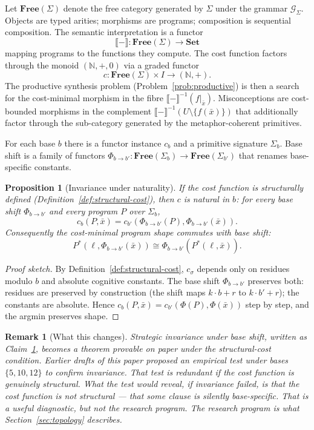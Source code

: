 \documentclass[11pt]{article}
\newtheorem{remark}{Remark}
\newtheorem{proposition}{Proposition}
\begin{document}
Let $\mathbf{Free}(\Sigma)$ denote the free category generated by
$\Sigma$ under the grammar $\mathcal{G}_\Sigma$. Objects are typed
arities; morphisms are programs; composition is sequential
composition. The semantic interpretation is a functor
\[
\llbracket - \rrbracket : \mathbf{Free}(\Sigma) \longrightarrow
\mathbf{Set}
\]
mapping programs to the functions they compute. The cost function
factors through the monoid $(\mathbb{N}, +, 0)$ via a graded functor
\[
c : \mathbf{Free}(\Sigma) \times I \longrightarrow (\mathbb{N}, +).
\]
The productive synthesis problem (Problem~\ref{prob:productive}) is
then a search for the cost-minimal morphism in the fibre
$\llbracket - \rrbracket^{-1}(f|_{\bar{x}})$. Misconceptions are
cost-bounded morphisms in the complement
$\llbracket - \rrbracket^{-1}(U \setminus \{f(\bar{x})\})$ that
additionally factor through the sub-category generated by the
metaphor-coherent primitives.

For each base $b$ there is a functor instance $c_b$ and a primitive
signature $\Sigma_b$. Base shift is a family of functors
$\Phi_{b \to b'} : \mathbf{Free}(\Sigma_b) \to
\mathbf{Free}(\Sigma_{b'})$ that renames base-specific constants.

\begin{proposition}[Invariance under naturality]
\label{prop:naturality}
If the cost function is structurally defined
(Definition~\ref{def:structural-cost}), then $c$ is natural in $b$:
for every base shift $\Phi_{b \to b'}$ and every program $P$ over
$\Sigma_b$,
\[
c_b(P, \bar{x}) = c_{b'}(\Phi_{b \to b'}(P), \Phi_{b \to b'}(\bar{x})).
\]
Consequently the cost-minimal program shape commutes with base shift:
\[
P^*(\ell, \Phi_{b \to b'}(\bar{x})) \cong \Phi_{b \to b'}(P^*(\ell,
\bar{x})).
\]
\end{proposition}

\begin{proof}[Proof sketch]
By Definition~\ref{def:structural-cost}, $c_\sigma$ depends only on
residues modulo $b$ and absolute cognitive constants. The base shift
$\Phi_{b \to b'}$ preserves both: residues are preserved by
construction (the shift maps $k \cdot b + r$ to $k \cdot b' + r$); the
constants are absolute. Hence $c_b(P, \bar{x}) = c_{b'}(\Phi(P),
\Phi(\bar{x}))$ step by step, and the argmin preserves shape.
\end{proof}

\begin{remark}[What this changes]
Strategic invariance under base shift, written as
Claim~\ref{prop:naturality}, becomes a theorem provable on paper
under the structural-cost condition. Earlier drafts of this paper
proposed an empirical test under bases $\{5, 10, 12\}$ to confirm
invariance. That test is redundant if the cost function is genuinely
structural. What the test \emph{would} reveal, if invariance failed,
is that the cost function is not structural — that some clause is
silently base-specific. That is a useful diagnostic, but not the
research program. The research program is what
Section~\ref{sec:topology} describes.
\end{remark}
\end{document}
